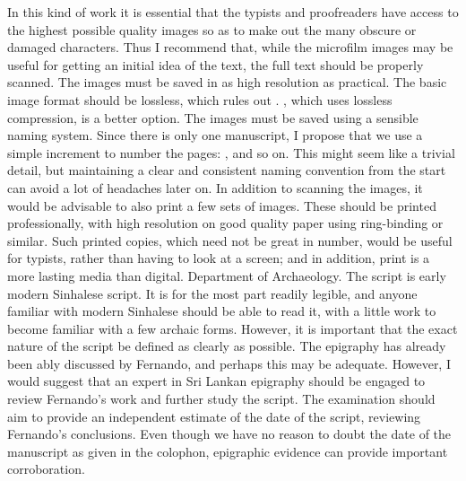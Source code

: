 {}In this kind of work it is essential that the typists and proofreaders have access to the highest possible quality images so as to make out the many obscure or damaged characters. Thus I recommend that, while the microfilm images may be useful for getting an initial idea of the text, the full text should be properly scanned.\markdownRendererInterblockSeparator
{}The images must be saved in as high resolution as practical. The basic image format should be lossless, which rules out . , which uses lossless compression, is a better option.\markdownRendererInterblockSeparator
{}The images must be saved using a sensible naming system. Since there is only one manuscript, I propose that we use a simple increment to number the pages: ,  and so on. This might seem like a trivial detail, but maintaining a clear and consistent naming convention from the start can avoid a lot of headaches later on.\markdownRendererInterblockSeparator
{}In addition to scanning the images, it would be advisable to also print a few sets of images. These should be printed professionally, with high resolution on good quality paper using ring-binding or similar. Such printed copies, which need not be great in number, would be useful for typists, rather than having to look at a screen; and in addition, print is a more lasting media than digital.\markdownRendererInterblockSeparator
{}\markdownRendererBlockQuoteBegin
{} Department of Archaeology.
\markdownRendererBlockQuoteEnd \markdownRendererInterblockSeparator
{}\markdownRendererInterblockSeparator
{}The script is early modern Sinhalese script. It is for the most part readily legible, and anyone familiar with modern Sinhalese should be able to read it, with a little work to become familiar with a few archaic forms. However, it is important that the exact nature of the script be defined as clearly as possible.\markdownRendererInterblockSeparator
{}The epigraphy has already been ably discussed by Fernando, and perhaps this may be adequate. However, I would suggest that an expert in Sri Lankan epigraphy should be engaged to review Fernando’s work and further study the script.\markdownRendererInterblockSeparator
{}The examination should aim to provide an independent estimate of the date of the script, reviewing Fernando’s conclusions. Even though we have no reason to doubt the date of the manuscript as given in the colophon, epigraphic evidence can provide important corroboration.\markdownRendererInterblockSeparator
